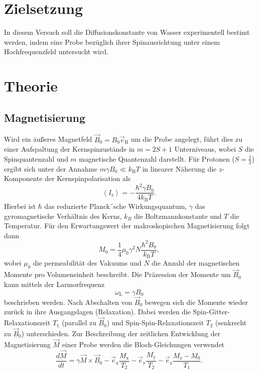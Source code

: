 \section{Zielsetzung}
\label{sec:Zielsetzung}

In diesem Versuch soll die Diffusionskonstante von Wasser experimentell bestimt werden,
indem eine Probe bezüglich ihrer Spinausrichtung unter einem Hochfrequenzfeld untersucht
wird. 

\section{Theorie}
\label{sec:Theorie}

\subsection{Magnetisierung}
\label{sec:Magnetisierung}

Wird ein äußeres Magnetfeld $\vec{B}_{\text{0}} = B_{\text{0}} \vec{e}_{\text{B}}$
um die Probe angelegt, führt dies zu einer
Aufspaltung der Kernspinzustände in $m = 2S+1$ Unterniveaus, wobei $S$ die Spinquantenzahl
und $m$ magnetische Quantenzahl darstellt. Für Protonen ($S=\frac{1}{2}$) ergibt sich  unter
der Annahme $m\gamma B_{\text{0}} \ll k_{\text{B}}T$ in linearer Näherung die 
$z$-Komponente der Kernspinpolarisation als 
\begin{equation}
    \left< I_{\text{z}} \right> = - \frac{\hbar^2 \gamma B_0}{4 k_{\text{B}} T}.
    \label{eq1}
\end{equation}
Hierbei ist $\hbar$ das reduzierte Planck´sche Wirkungsquantum, $\gamma$ das 
gyromagnetische Verhältnis des Kerns, $k_{B}$ die Boltzmannkonstante und $T$ die 
Temperatur. Für den Erwartungswert der makroskopischen Magnetisierung folgt dann 
\begin{equation}
    M_0 = \frac{1}{4} \mu_0 \gamma^2 N \frac{\hbar^2 B_0}{k_\text{B} T},
    \label{eq2}
\end{equation}
wobei $\mu_{\text{0}}$ die permeabilität des Vakuums und $N$ die Anzahl der 
magnetischen Momente pro Volumeneinheit beschreibt. 
Die Präzession der Momente um $\vec{B}_{\text{0}}$ kann mittels der Larmorfrequenz 
\begin{equation}
    \omega_{\text{L}}= \gamma B_{\text{0}}
    \label{eq3}
\end{equation}
beschrieben werden.
Nach Abschalten von $\vec{B}_{\text{0}}$ bewegen sich die Momente wieder zurück in 
ihre Ausgangslagen (Relaxation). 
Dabei werden die Spin-Gitter-Relaxationszeit $T_{\text{1}}$ 
(parallel zu $\vec{B}_{\text{0}}$) und Spin-Spin-Relaxationszeit $T_{\text{2}}$
(senkrecht zu $\vec{B}_{\text{0}}$) unterschieden.
Zur Beschreibung der zeitlichen Entwicklung der Magnetisierung $\vec{M}$ einer Probe 
werden die Bloch-Gleichungen verwendet 
\begin{equation}
    \frac{d \vec{M}}{dt} 
    = \gamma \vec{M} \times \vec{B}_{\text{0}} 
    - \vec{e}_{\text{x}} \frac{M_{\text{x}}}{T_{\text{2}}} 
    - \vec{e}_{\text{y}} \frac{M_{\text{y}}}{T_{\text{2}}} 
    - \vec{e}_{\text{z}} \frac{M_{\text{z}}-M_{\text{0}}}{T_{\text{1}}}.
  \label{eq4}
\end{equation}
\cite{sample}
